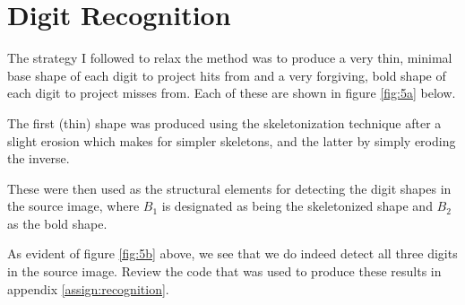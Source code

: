%
%

\section{Digit Recognition}
The strategy I followed to relax the method was to produce a very thin,
minimal base shape of each digit to project hits from and a very forgiving,
bold shape of each digit to project misses from. Each of these are shown in
figure \ref{fig:5a} below.

The first (thin) shape was produced using the skeletonization technique after
a slight erosion which makes for simpler skeletons, and the latter by simply
eroding the inverse.


These were then used as the structural elements for detecting the digit shapes
in the source image, where $B_1$ is designated as being the skeletonized shape
and $B_2$ as the bold shape.


As evident of figure \ref{fig:5b} above, we see that we do indeed detect all
three digits in the source image. Review the code that was used to produce
these results in appendix \ref{assign:recognition}.


